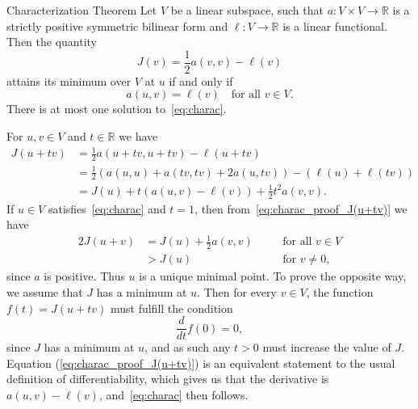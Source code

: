 
\begin{thmx}{Characterization Theorem}
    Let $V$ be a linear subspace, such that
        \(
            a: V \times V \rightarrow \mathbb{R}
        \) 
    is a strictly positive symmetric bilinear form
     and
        \(
            \ell: V \rightarrow \mathbb{R}
        \)
    is a linear functional. Then the quantity
        \[
            J(v)=\frac{1}{2} a(v,v) - \ell(v)
        \]
    attains its minimum over $V$ at $u$ if and only if
        \begin{equation}
            a(u,v) = \ell(v) \quad \text{for all } v \in V.
        \label{eq:charac}
        \end{equation}
    There is at most one solution to~\eqref{eq:charac}.\label{thm:charac_theorem}
\end{thmx}

\begin{bev}
    For $u,v \in V$ and $t \in \mathbb{R}$ we have
    \begin{align}
        J(u+tv) &= \frac{1}{2} a(u+tv,u+tv) - \ell(u+tv) \nonumber \\
        &= \frac{1}{2} \left( a(u,u) + a(tv,tv) + 2a(u,tv) \right) - \left(  \ell(u) + \ell(tv)\right) \nonumber \\
        &= J(u) + t\left( a(u,v) - \ell(v) \right) + \frac{1}{2}t^2a(v,v). \label{eq:charac_proof_J(u+tv)}
    \end{align}
    If $u \in V$ satisfies~\eqref{eq:charac} and $t=1$, then from~\eqref{eq:charac_proof_J(u+tv)} we have
    \begin{alignat}{2}
        J(u+v) &= J(u) + \frac{1}{2}a(v,v) \quad &&\text{for all } v\in V  \nonumber \\
        &> J(u) \quad &&\text{for } v \neq 0,
    \end{alignat}
    since $a$ is positive.
    Thus $u$ is a unique minimal point. 
    To prove the opposite way, we assume that $J$ has a minimum at $u$.
    Then for every $v\in V$, the function $f(t)= J(u+tv)$ must fulfill the condition
    \begin{equation*}
        \frac{d}{dt}f(0) = 0,
    \end{equation*}
    since $J$ has a minimum at $u$, and as such any $t>0$ must increase the 
    value of $J$.
    Equation (\ref{eq:charac_proof_J(u+tv)}) is an equivalent statement to 
    the usual definition of differentiability, which gives us that 
     the derivative is $a(u,v) - \ell(v)$, and~\eqref{eq:charac} then follows.
\end{bev}